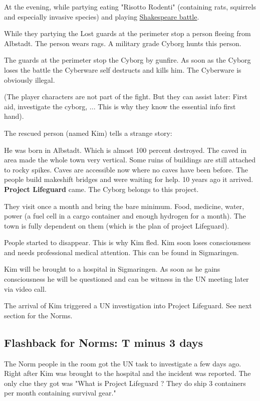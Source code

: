At the evening, while partying eating "Risotto Rodenti" (containing rats, squirrels and especially invasive species) and playing \hyperref[sec:Shakespeare battle]{Shakespeare battle}.

While they partying the Lost guards at the perimeter stop a person fleeing from Albstadt. The person wears rags. A military grade Cyborg hunts this person.

The guards at the perimeter stop the Cyborg by gunfire. As soon as the Cyborg loses the battle the Cyberware self destructs and kills him. The Cyberware is obviously illegal.

(The player characters are not part of the fight. But they can assist later: First aid, investigate the cyborg, ... This is why they know the essential info first hand).

The rescued person (named Kim) tells a strange story:

He was born in Albstadt. Which is almost 100 percent destroyed. The caved in area made the whole town very vertical. Some ruins of buildings are still attached to rocky spikes. Caves are accessible now where no caves have been before. The people build makeshift bridges and were waiting for help. 10 years ago it arrived. \textbf{Project Lifeguard} came. The Cyborg belongs to this project.

They visit once a month and bring the bare minimum. Food, medicine, water, power (a fuel cell in a cargo container and enough hydrogen for a month). The town is fully dependent on them (which is the plan of project Lifeguard).

People started to disappear. This is why Kim fled. Kim soon loses consciousness and needs professional medical attention. This can be found in Sigmaringen.

Kim will be brought to a hospital in Sigmaringen. As soon as he gains consciousness he will be questioned and can be witness in the UN meeting later via video call.

The arrival of Kim triggered a UN investigation into Project Lifeguard. See next section for the Norms.

\subsection{Flashback for Norms: T minus 3 days}

The Norm people in the room got the UN task to investigate a few days ago. Right after Kim was brought to the hospital and the incident was reported. The only clue they got was "What is Project Lifeguard ? They do ship 3 containers per month containing survival gear."


